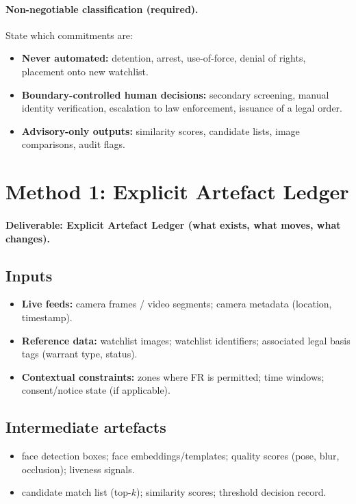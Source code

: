 \paragraph{Non-negotiable classification (required).}
State which commitments are:
\begin{itemize}
  \item \textbf{Never automated:} detention, arrest, use-of-force, denial of rights, placement onto new watchlist.
  \item \textbf{Boundary-controlled human decisions:} secondary screening, manual identity verification, escalation to
        law enforcement, issuance of a legal order.
  \item \textbf{Advisory-only outputs:} similarity scores, candidate lists, image comparisons, audit flags.
\end{itemize}

\section{Method 1: Explicit Artefact Ledger}
\label{sec:airport-m1}

\paragraph{Deliverable: Explicit Artefact Ledger (what exists, what moves, what changes).}

\subsection*{Inputs}
\begin{itemize}
  \item \textbf{Live feeds:} camera frames / video segments; camera metadata (location, timestamp).
  \item \textbf{Reference data:} watchlist images; watchlist identifiers; associated legal basis tags (warrant type, status).
  \item \textbf{Contextual constraints:} zones where FR is permitted; time windows; consent/notice state (if applicable).
\end{itemize}

\subsection*{Intermediate artefacts}
\begin{itemize}
  \item face detection boxes; face embeddings/templates; quality scores (pose, blur, occlusion); liveness signals.
  \item candidate match list (top-$k$); similarity scores; threshold decision record.
\end{itemize}

